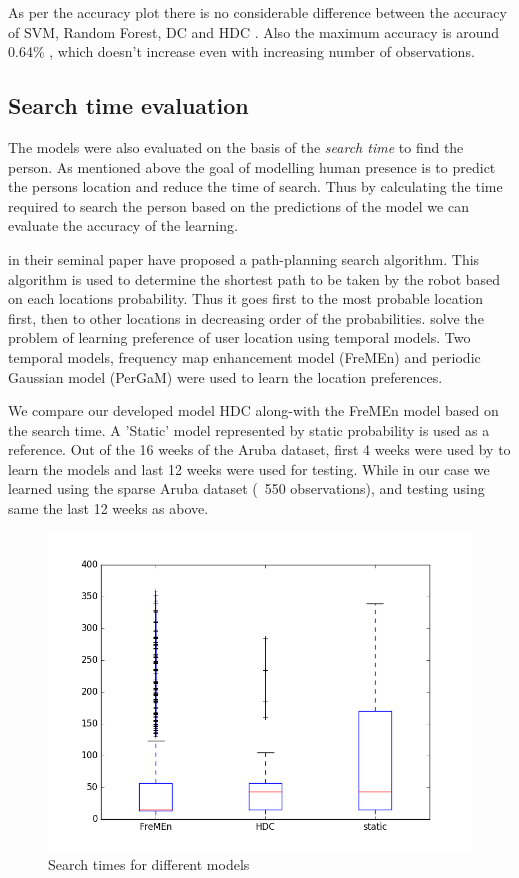 As per the accuracy plot there is no considerable difference between the accuracy of  SVM, Random Forest, DC and HDC . Also the maximum accuracy is around 0.64\% , which doesn’t increase even with increasing number of observations. 


\subsection{Search time evaluation}
The models were also evaluated on the basis of the \emph{search time} to find the person. As mentioned above the goal of modelling human presence is to predict the persons location and reduce the time of search. Thus by calculating the time required to search the person based on the predictions of the model we can evaluate the accuracy of the learning.

\cite{krajnik_wheres_2015} in their seminal paper have proposed a path-planning search algorithm. This algorithm is used to determine the shortest path to be taken by the robot based on each locations probability. Thus it goes first to the most probable location first, then to other locations in decreasing order of the probabilities. \cite{krajnik_wheres_2015} solve the problem of learning preference of user location using temporal models. Two temporal models, frequency map enhancement  model  (FreMEn) and periodic Gaussian model (PerGaM) were used to learn the location preferences. 

We compare our developed model HDC along-with the FreMEn model based on the search time. A 'Static' model represented by static probability is used as a reference. Out of the 16 weeks of the Aruba dataset, first 4 weeks were used by \cite{krajnik_wheres_2015} to learn the models and last 12 weeks were used for testing. While in our case we learned using the sparse Aruba dataset  (~550 observations), and testing using same the last 12 weeks as above.

\begin{figure}[htp]
\centering
\includegraphics[width=\textwidth]{images/box_plot_fremen_hdc.png}
\caption[Search time evaluation]{Search times for different models}
\label{fig:search_time}
\end{figure}

